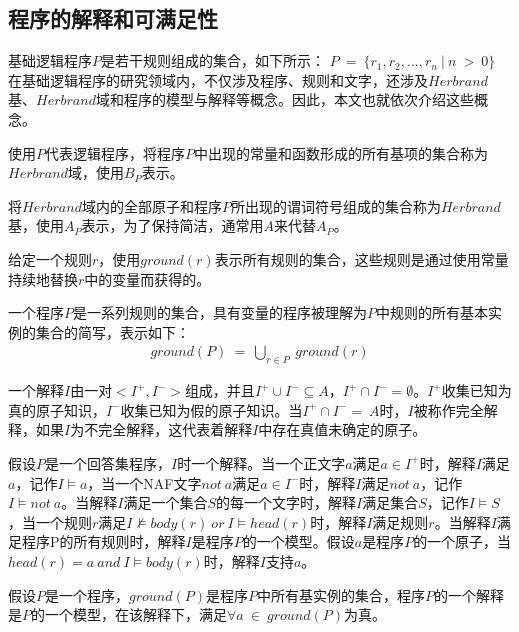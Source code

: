 \subsection{程序的解释和可满足性}
\begin{definition}[基础逻辑程序]基础逻辑程序$P$是若干规则组成的集合，如下所示：
    $P \ = \ \{r_1,r_2,...,r_n \ | \ n \ > \ 0\}$
    在基础逻辑程序的研究领域内，不仅涉及程序、规则和文字，还涉及$Herbrand$基、$Herbrand$域和程序的模型与解释等概念。因此，本文也就依次介绍这些概念。
\end{definition}
\begin{definition}[Herbrand域H]使用$P$代表逻辑程序，将程序$P$中出现的常量和函数形成的所有基项的集合称为$Herbrand$域，使用$B_P$表示。
\end{definition}
\begin{definition}[Herbrand基]将$Herbrand$域内的全部原子和程序$P$所出现的谓词符号组成的集合称为$Herbrand$基，使用$A_P$表示，为了保持简洁，通常用$A$来代替$A_P$。
\end{definition}
\begin{definition}给定一个规则$r$，使用$ground(r)$表示所有规则的集合，这些规则是通过使用常量持续地替换$r$中的变量而获得的。
\end{definition}
\begin{definition}一个程序$P$是一系列规则的集合，具有变量的程序被理解为$P$中规则的所有基本实例的集合的简写，表示如下：
    \begin{align}
        \label{rule:4}
        ground(P) \ = \ \bigcup_{r \in P} \ ground(r)
    \end{align}
\end{definition}

一个解释$I$由一对$<I^+,I^->$组成，并且$ I^+ \cup I^- \subseteq A$，$I^+ \cap I^- = \emptyset$。$I^+$收集已知为真的原子知识，$I^-$收集已知为假的原子知识。当$I^+ \cap I^- = \ A$时，$I$被称作完全解释，如果$I$为不完全解释，这代表着解释$I$中存在真值未确定的原子。

假设$P$是一个回答集程序，$I$时一个解释。当一个正文字$a$满足$a \in I^+$时，解释$I$满足$a$，记作$ I \models a$，当一个NAF文字$not \ a$满足$a \in I^-$时，解释$I$满足$not \ a$，记作$ I \models not \ a$。当解释$I$满足一个集合$S$的每一个文字时，解释$I$满足集合$S$，记作$ I \models S$，当一个规则$r$满足$ I \nvDash body(r) \ or \ I \models head(r)$时，解释$I$满足规则$r$。当解释$I$满足程序P的所有规则时，解释$I$是程序$P$的一个模型。假设$a$是程序$P$的一个原子，当$head(r)=a \ and \ I \models body(r)$时，解释$I$支持$a$。


\begin{definition}[程序的模型]假设$P$是一个程序，$ground(P)$是程序$P$中所有基实例的集合，程序$P$的一个解释是$P$的一个模型，在该解释下，满足$ \forall a \ \in  \ ground(P)$为真。
\end{definition}
